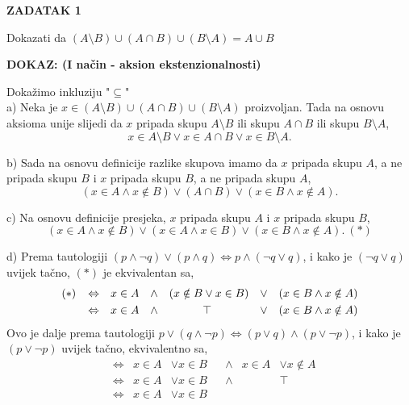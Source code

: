 \documentclass{article}
\begin{document}
    \thispagestyle{empty}

    \begin{flushleft}

        \textbf{ZADATAK 1}\\
        \bigskip

        Dokazati da
        $(A\setminus B)\cup (A\cap B)\cup (B\setminus A)=A\cup B$\\
        \bigskip

        \textbf{DOKAZ: (I način - aksion ekstenzionalnosti)}
    \end{flushleft}

    \noindent
    Dokažimo inkluziju "$\subseteq $"\\
    a) Neka je $x\in (A\setminus B)\cup (A\cap B)\cup (B\setminus A)$ proizvoljan. Tada na osnovu aksioma unije slijedi da $x$ pripada skupu $A\setminus B$ ili skupu $A\cap B$ ili skupu $B\setminus A$,
    $$x\in A\setminus B\vee x\in A\cap B\vee x\in B\setminus A.$$
    \smallskip

    \noindent
    b) Sada na osnovu definicije razlike skupova imamo da $x$ pripada skupu $A$, a ne pripada skupu $B$ i $x$ pripada skupu $B$, a ne pripada skupu $A$,
    $$(x\in A\land x\notin B)\vee (A\cap B)\vee (x\in B\land x\notin A).$$
    \smallskip

    \noindent
    c) Na osnovu definicije presjeka, $x$ pripada skupu $A$ i $x$ pripada skupu $B$,
    $$(x\in A\land x\notin B)\vee (x\in A\land x\in B)\vee (x\in B\land x\notin A).\ (\ast ) $$
    \smallskip

    \noindent
    d) Prema tautologiji $(p\land \lnot q)\vee (p\land q)\Leftrightarrow  p\land (\lnot q\vee q)$, i kako je $(\lnot q\vee q)$ uvijek tačno, $(\ast )$ je ekvivalentan sa,
    \begin{align*}
       (\ast )\hspace{8px} &\Leftrightarrow & &x\in A & &\land & (x\notin B&\vee x\in B) & &\vee & &(x\in B\land x\notin A)\\
                           &\Leftrightarrow & &x\in A & &\land & &\top & &\vee & &(x\in B\land x\notin A)
    \end{align*}
    Ovo je dalje prema tautologiji $p\vee (q\land \lnot p)\Leftrightarrow (p\vee q)\land (p\vee \lnot p)$, i kako je $(p\vee \lnot p)$ uvijek tačno, ekvivalentno sa,
    \begin{align*}
        &\Leftrightarrow & x\in A&\vee x\in B & &\land & x\in A&\vee x\notin A\\
        &\Leftrightarrow & x\in A&\vee x\in B & &\land & &\top \\
        &\Leftrightarrow & x\in A&\vee x\in B
    \end{align*}
    \smallskip
\end{document}
